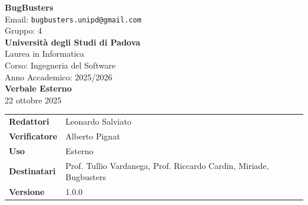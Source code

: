 \documentclass[a4paper,12pt]{article}
\newcommand{\CurrentVersion}{1.0.0}
\begin{document}
\begin{center}  
  
  {\Large\bfseries\color{primaryblue} BugBusters}\\[0.3cm]
  {\small\color{darkgray} Email: \texttt{bugbusters.unipd@gmail.com}} \\[0.1cm]
  {\small\color{darkgray} Gruppo: 4} \\[0.5cm]

  {\large\bfseries Università degli Studi di Padova}\\[0.3cm]
  {\small Laurea in Informatica}\\[0.2cm]
  {\small Corso: Ingegneria del Software}\\[0.2cm]
  {\small Anno Accademico: 2025/2026}\\[0.8cm]

  {\Huge\bfseries\color{primaryblue} Verbale Esterno}\\[0.3cm]
  {\Large\color{secondaryblue} 22 ottobre 2025}\\[0.8cm]
\end{center}

\begin{center}
\begin{tcolorbox}[colback=lightgray,colframe=primaryblue,width=0.85\textwidth,arc=3mm,boxrule=0.5pt]
\begin{tabularx}{\linewidth}{@{}lX@{}}
\textbf{Redattori}   & Leonardo Salviato\\
\textbf{Verificatore} & Alberto Pignat\\
\textbf{Uso}          & Esterno\\
\textbf{Destinatari}  & Prof. Tullio Vardanega, Prof. Riccardo Cardin, Miriade, Bugbusters\\
\textbf{Versione} & \CurrentVersion \\

\end{tabularx}
\end{tcolorbox}
\end{center}
\vspace{0.5cm}
\end{document}

